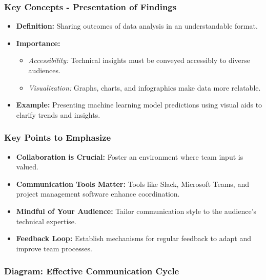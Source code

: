 \documentclass[aspectratio=169]{beamer}
\begin{document}
\begin{frame}[fragile]
    \frametitle{Key Concepts - Presentation of Findings}
    \begin{itemize}
        \item \textbf{Definition:} Sharing outcomes of data analysis in an understandable format.
        \item \textbf{Importance:}
        \begin{itemize}
            \item \textit{Accessibility:} Technical insights must be conveyed accessibly to diverse audiences.
            \item \textit{Visualization:} Graphs, charts, and infographics make data more relatable.
        \end{itemize}
        \item \textbf{Example:} Presenting machine learning model predictions using visual aids to clarify trends and insights.
    \end{itemize}
\end{frame}

\begin{frame}[fragile]
    \frametitle{Key Points to Emphasize}
    \begin{itemize}
        \item \textbf{Collaboration is Crucial:} Foster an environment where team input is valued.
        \item \textbf{Communication Tools Matter:} Tools like Slack, Microsoft Teams, and project management software enhance coordination.
        \item \textbf{Mindful of Your Audience:} Tailor communication style to the audience's technical expertise.
        \item \textbf{Feedback Loop:} Establish mechanisms for regular feedback to adapt and improve team processes.
    \end{itemize}
\end{frame}

\begin{frame}[fragile]
    \frametitle{Diagram: Effective Communication Cycle}
    \begin{center}
    \end{center}
\end{frame}
\end{document}
